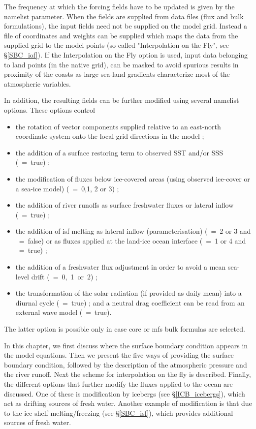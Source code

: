 \documentclass[NEMO_book]{subfiles}
\begin{document}
The frequency at which the forcing fields have to be updated is given by the  namelist parameter. 
When the fields are supplied from data files (flux and bulk formulations), the input fields 
need not be supplied on the model grid. Instead a file of coordinates and weights can 
be supplied which maps the data from the supplied grid to the model points 
(so called "Interpolation on the Fly", see \S\ref{SBC_iof}).
If the Interpolation on the Fly option is used, input data belonging to land points (in the native grid),
can be masked to avoid spurious results in proximity of the coasts  as large sea-land gradients characterize
most of the atmospheric variables.

In addition, the resulting fields can be further modified using several namelist options. 
These options control 
\begin{itemize}
\item the rotation of vector components supplied relative to an east-north 
coordinate system onto the local grid directions in the model ; 
\item the addition of a surface restoring term to observed SST and/or SSS (~=~true) ; 
\item the modification of fluxes below ice-covered areas (using observed ice-cover or a sea-ice model) (~=~0,1, 2 or 3) ; 
\item the addition of river runoffs as surface freshwater fluxes or lateral inflow (~=~true) ; 
\item the addition of isf melting as lateral inflow (parameterisation) (~=~2 or 3 and ~=~false) 
or as fluxes applied at the land-ice ocean interface (~=~1 or 4 and ~=~true) ; 
\item the addition of a freshwater flux adjustment in order to avoid a mean sea-level drift (~=~0,~1~or~2) ; 
\item the transformation of the solar radiation (if provided as daily mean) into a diurnal cycle (~=~true) ; 
and a neutral drag coefficient can be read from an external wave model (~=~true). 
\end{itemize}
The latter option is possible only in case core or mfs bulk formulas are selected.

In this chapter, we first discuss where the surface boundary condition appears in the
model equations. Then we present the five ways of providing the surface boundary condition, 
followed by the description of the atmospheric pressure and the river runoff. 
Next the scheme for interpolation on the fly is described.
Finally, the different options that further modify the fluxes applied to the ocean are discussed.
One of these is modification by icebergs (see \S\ref{ICB_icebergs}), which act as drifting sources of fresh water.
Another example of modification is that due to the ice shelf melting/freezing (see \S\ref{SBC_isf}), 
which provides additional sources of fresh water.
\end{document}
